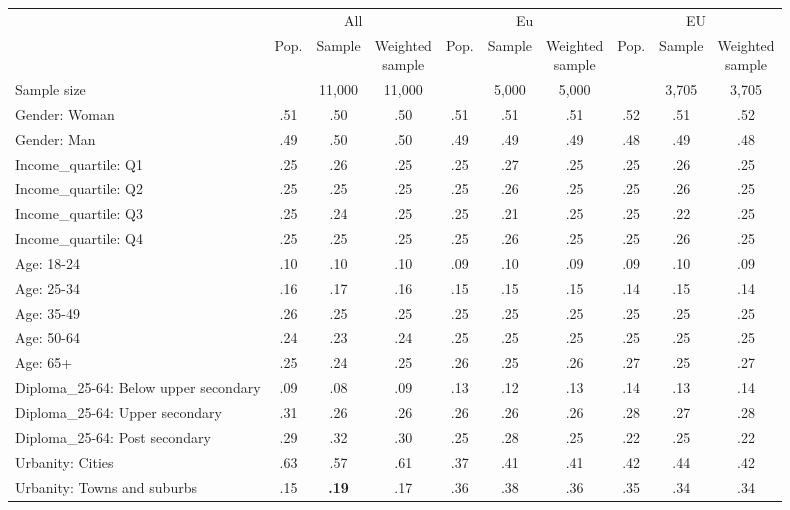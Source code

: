 
\begin{tabular}[t]{lccccccccc}
\toprule
\multicolumn{1}{c}{} & \multicolumn{3}{c}{All} & \multicolumn{3}{c}{Eu} & \multicolumn{3}{c}{EU} \\
\cmidrule(l{3pt}r{3pt}){2-4} \cmidrule(l{3pt}r{3pt}){5-7} \cmidrule(l{3pt}r{3pt}){8-10}
  & Pop. & Sample & \makecell{Weighted\\sample} & Pop. & Sample & \makecell{Weighted\\sample} & Pop. & Sample & \makecell{Weighted\\sample}\\
\midrule
Sample size &  & 11,000 & 11,000 &  & 5,000 & 5,000 &  & 3,705 & 3,705\\
\addlinespace
Gender: Woman & .51 & .50 & .50 & .51 & .51 & .51 & .52 & .51 & .52\\
Gender: Man & .49 & .50 & .50 & .49 & .49 & .49 & .48 & .49 & .48\\
\addlinespace
Income\_quartile: Q1 & .25 & .26 & .25 & .25 & .27 & .25 & .25 & .26 & .25\\
Income\_quartile: Q2 & .25 & .25 & .25 & .25 & .26 & .25 & .25 & .26 & .25\\
Income\_quartile: Q3 & .25 & .24 & .25 & .25 & .21 & .25 & .25 & .22 & .25\\
Income\_quartile: Q4 & .25 & .25 & .25 & .25 & .26 & .25 & .25 & .26 & .25\\
\addlinespace
Age: 18-24 & .10 & .10 & .10 & .09 & .10 & .09 & .09 & .10 & .09\\
Age: 25-34 & .16 & .17 & .16 & .15 & .15 & .15 & .14 & .15 & .14\\
Age: 35-49 & .26 & .25 & .25 & .25 & .25 & .25 & .25 & .25 & .25\\
Age: 50-64 & .24 & .23 & .24 & .25 & .25 & .25 & .25 & .25 & .25\\
Age: 65+ & .25 & .24 & .25 & .26 & .25 & .26 & .27 & .25 & .27\\
\addlinespace
Diploma\_25-64: Below upper secondary & .09 & .08 & .09 & .13 & .12 & .13 & .14 & .13 & .14\\
Diploma\_25-64: Upper secondary & .31 & .26 & .26 & .26 & .26 & .26 & .28 & .27 & .28\\
Diploma\_25-64: Post secondary & .29 & .32 & .30 & .25 & .28 & .25 & .22 & .25 & .22\\
\addlinespace
Urbanity: Cities & .63 & .57 & .61 & .37 & .41 & .41 & .42 & .44 & .42\\
Urbanity: Towns and suburbs & .15 & \textbf{.19} & .17 & .36 & .38 & .36 & .35 & .34 & .34\\

\end{tabular}

